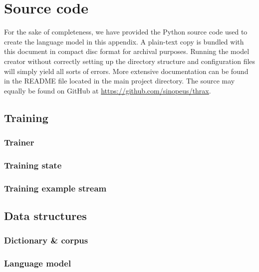 \chapter{Source code}
\label{chp:sourcecode}
For the sake of completeness, we have provided the Python source code
used to create the language model in this appendix. A plain-text copy
is bundled with this document in compact disc format for archival
purposes. Running the model creator without correctly setting up the
directory structure and configuration files will simply yield all
sorts of errors. More extensive documentation can be found in the
README file located in the main project directory. The source may
equally be found on GitHub at \url{https://github.com/sinopeus/thrax}.

\section{Training}
\subsection{Trainer}
\label{sec:trainer}

\subsection{Training state}
\label{sec:trainstate}

\subsection{Training example stream}
\label{sec:trainexamplestream}

\section{Data structures}
\subsection{Dictionary \& corpus}
\label{sec:dict}

\subsection{Language model}
\label{sec:langmodel}

